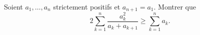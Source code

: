 Soient $a_1, \ldots, a_n$ strictement positifs et $a_{n+1} = a_1$. Montrer que
\[ 2\sum_{k=1}^n \frac{a_k^2}{a_k + a_{k+1}} \geq \sum_{k=1}^n a_k. \]
